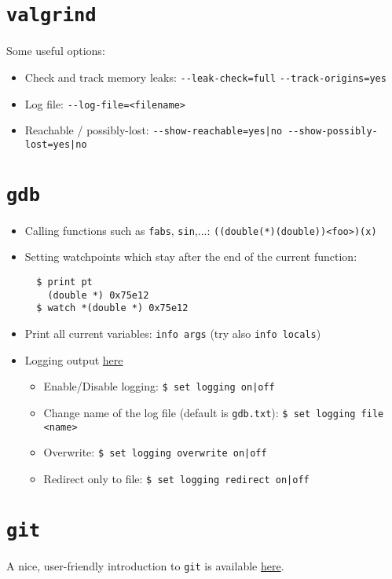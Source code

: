 \documentclass[a4paper,12pt,%
              final%
              ]{article}
\begin{document}
\section{\texttt{valgrind}}
Some useful options:
\begin{itemize}
  \item Check and track memory leaks: \verb|--leak-check=full| \verb|--track-origins=yes|
  \item Log file: \verb|--log-file=<filename>|
  \item Reachable / possibly-lost: \verb!--show-reachable=yes|no --show-possibly-lost=yes|no!
\end{itemize}

\section{\texttt{gdb}}
\label{sec:gdb}
\begin{itemize}
  \item Calling functions such as \texttt{fabs}, \texttt{sin},...: \texttt{((double(*)(double))<foo>)(x)}
  \item Setting watchpoints which stay after the end of the current function:
\begin{verbatim}
  $ print pt
    (double *) 0x75e12
  $ watch *(double *) 0x75e12
\end{verbatim}
  \item Print all current variables: \texttt{info args} (try also \texttt{info locals})
  \item Logging output \href{https://sourceware.org/gdb/onlinedocs/gdb/Logging-Output.html}{here}
    \begin{itemize}
      \item Enable/Disable logging: \verb!$ set logging on|off!
      \item Change name of the log file (default is \texttt{gdb.txt}): \verb|$ set logging file <name>|
      \item Overwrite: \verb!$ set logging overwrite on|off!
      \item Redirect only to file: \verb!$ set logging redirect on|off!
    \end{itemize}
\end{itemize}

\section{\texttt{git}}
\label{sec:git}
A nice, user-friendly introduction to \texttt{git} is available \href{https://www.atlassian.com/git/tutorials/learn-git-with-bitbucket-cloud}{here}.
\end{document}
